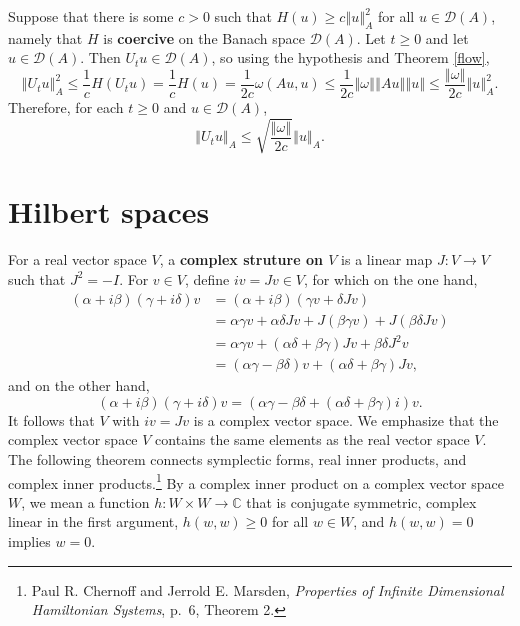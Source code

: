 \documentclass{article}
\newcommand{\norm}[1]{\left\Vert #1 \right\Vert}
\theoremstyle{definition}
\begin{document}
Suppose that there is some $c>0$ such that $H(u) \geq c \norm{u}_A^2$ for all $u \in \mathscr{D}(A)$, namely
that $H$ is \textbf{coercive} on the Banach space $\mathscr{D}(A)$.
Let $t \geq 0$ and 
let $u \in \mathscr{D}(A)$. 
Then $U_t u \in \mathscr{D}(A)$, so using the hypothesis and Theorem \ref{flow},
\[
\norm{U_t u}_A^2 \leq \frac{1}{c} H(U_t u)=\frac{1}{c}H(u)
=\frac{1}{2c}\omega(Au,u)
\leq \frac{1}{2c} \norm{\omega} \norm{Au} \norm{u}
\leq \frac{\norm{\omega}}{2c} \norm{u}_A^2.
\]
Therefore, for each $t \geq 0$ and $u \in \mathscr{D}(A)$,
\[
\norm{U_t u}_A \leq \sqrt{\frac{\norm{\omega}}{2c}} \norm{u}_A.
\]



\section{Hilbert spaces}
For a real vector space $V$, a \textbf{complex struture on $V$} is a linear map
$J:V \to V$ such that $J^2=-I$.
For $v \in V$, define $iv=Jv \in V$,
for which on the one hand,
\begin{align*}
(\alpha+i\beta)(\gamma+i\delta)v &= 
(\alpha+i\beta)(\gamma v + \delta Jv)\\
&=\alpha \gamma v + \alpha \delta Jv
+J(\beta \gamma v) + J(\beta \delta Jv)\\
&=\alpha \gamma v+(\alpha \delta+\beta \gamma)Jv + \beta \delta J^2 v\\
&=(\alpha \gamma - \beta \delta)v + (\alpha \delta+\beta \gamma)Jv,
\end{align*}
and on the other hand,
\[
(\alpha+i\beta)(\gamma+i\delta)v  = (\alpha \gamma-\beta \delta + (\alpha \delta + \beta \gamma)i)v.
\]
It follows that $V$ with $iv=Jv$ is a complex vector space. We emphasize that the complex vector space $V$ contains the same
elements as the real vector space $V$.
The following theorem connects symplectic forms, real inner products, and complex inner products.\footnote{Paul R. Chernoff and Jerrold E. Marsden, {\em Properties of Infinite Dimensional Hamiltonian Systems}, p.~6, Theorem 2.} By a complex inner product on a complex vector space
$W$, we mean a function $h:W \times W \to \mathbb{C}$ that is conjugate symmetric, complex linear in the first argument, $h(w,w) \geq 0$
for all $w \in W$, and $h(w,w)=0$ implies $w=0$.
\end{document}
